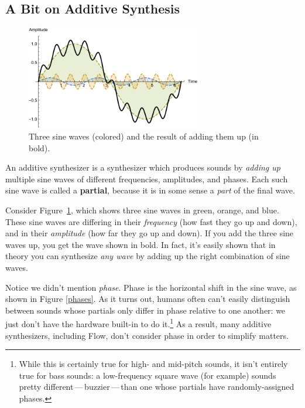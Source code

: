 \documentclass{article}
\newcommand\name{Flow}
\begin{document}
\subsection{A Bit on Additive Synthesis}  
\label{additivesynthesis}

\begin{figure}
\vspace{-1em}
\includegraphics[width=3in]{sinewaves}
\caption{Three sine waves (colored) and the result of adding them up (in bold).}
\label{sinewaves}
\vspace{-1em}
\end{figure}

An additive synthesizer is a synthesizer which produces sounds by {\it adding up} multiple sine waves of different frequencies, amplitudes, and phases.  Each such sine wave is called a {\bf partial}, because it is in some sense a {\it part} of the final wave.

Consider Figure~\ref{sinewaves}, which shows three sine waves in green, orange, and blue.  These sine waves are differing in their {\it frequency} (how fast they go up and down), and in their {\it amplitude} (how far they go up and down).  If you add the three sine waves up, you get the wave shown in bold.  In fact, it's easily shown that in theory you can synthesize {\it any wave} by adding up the right combination of sine waves.

Notice we didn't mention {\it phase}.  Phase is the horizontal shift in the sine wave, as shown in Figure \ref{phases}.  As it turns out, humans often can't easily distinguish between sounds whose partials only differ in phase relative to one another: we just don't have the hardware built-in to do it.\footnote{While this is certainly true for high- and mid-pitch sounds, it isn't entirely true for bass sounds: a low-frequency square wave (for example) sounds pretty different\,---\,buzzier\,---\,than one whose partials have randomly-assigned phases.}   As a result,  many additive synthesizers, including {\name}, don't consider phase in order to simplify matters.
\end{document}
